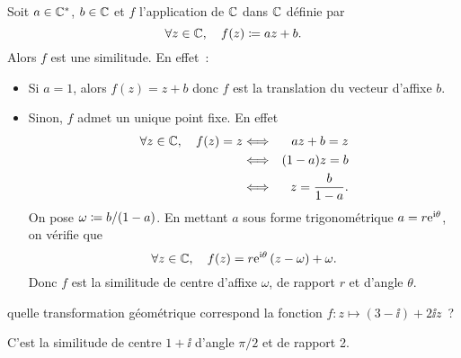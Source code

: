 \documentclass{magnoliaold}
\begin{document}
\begin{preuve}
Soit $a\in\mathbb{C}^*$, $b\in\mathbb{C}$ et $f$ l'application de $\mathbb{C}$ dans $\mathbb{C}$ définie par
\[\forall z\in\mathbb{C},\quad f(z)\coloneqq az+b.\]
Alors $f$ est une similitude. En effet~:
\begin{itemize}
\item Si $a=1$, alors $f(z)=z+b$ donc $f$ est la translation du vecteur d'affixe $b$.
\item Sinon, $f$ admet un unique point fixe. En effet
\begin{eqnarray*}
\forall z\in\mathbb{C},\quad f(z)=z
&\Longleftrightarrow& az+b = z\\
&\Longleftrightarrow& (1-a)z=b\\
&\Longleftrightarrow& z=\frac{b}{1-a}.
\end{eqnarray*}
On pose $\omega\coloneqq b/(1-a)$. En mettant $a$ sous forme trigonométrique $a= r{\rm e}^{{\rm i}\theta}$, on vérifie que
\[\forall z\in\mathbb{C},\quad f(z)=r{\rm e}^{{\rm i}\theta}\left(z-\omega\right)+\omega.\]
Donc $f$ est la similitude de centre d'affixe $\omega$, de rapport $r$ et d'angle $\theta$.
\end{itemize}
\end{preuve}

\begin{exoUnique}
 quelle transformation géométrique correspond la fonction $f : z \mapsto
(3-\ii)+2\ii z$~?
\begin{sol}
C'est la similitude de centre $1+\ii$ d'angle $\pi/2$ et de rapport 2.
\end{sol}
\end{exoUnique}


\end{document}
